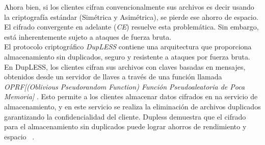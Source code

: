 Ahora bien, si los clientes cifran convencionalmente sus archivos es decir usando la criptografía estándar (Simétrica y Asimétrica), se pierde ese ahorro de espacio. El cifrado convergente en adelante (\textit{CE}) resuelve esta problemática. Sin embargo, está inherentemente sujeto a ataques de fuerza bruta.\\

El protocolo criptográfico \textit{DupLESS} contiene una arquitectura que proporciona almacenamiento sin duplicados, seguro y resistente a ataques por fuerza bruta. En DupLESS, los clientes cifran sus archivos con claves basadas en mensajes, obtenidos
desde un servidor de llaves a través de una función llamada \textit{OPRF[(Oblivious Pseudorandom Function) Función Pseudoaleatoria de Poca Memoria] }. Esto permite a los clientes almacenar datos cifrados en na servicio de almacenamiento, y en este servicio se realiza la eliminación de archivos duplicados garantizando la confidencialidad del cliente. Dupless demuestra que el cifrado para el almacenamiento sin duplicados puede lograr ahorros de rendimiento y espacio ~\cite{dupless}. \\







